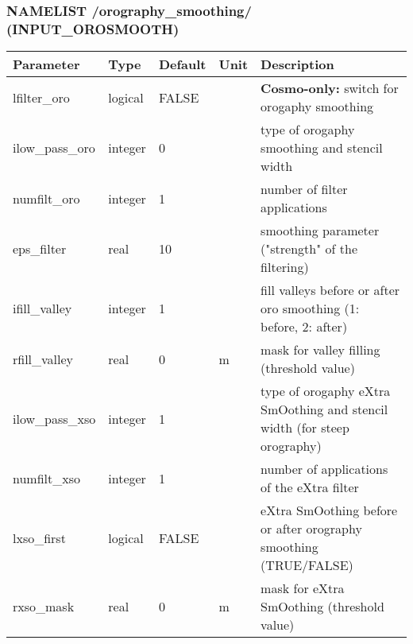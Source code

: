 \documentclass[a4paper,10pt,DIV14,BCOR1cm,titlepage,twoside]{scrartcl}
\providecommand{\tabularnewline}{\\}
\begin{document}
\subsubsection*{NAMELIST /orography\_smoothing/ (INPUT\_OROSMOOTH)}
\begin{longtable}{|p{4cm}|p{1.5cm}|p{1.5cm}|p{1cm}|p{6cm}|}
\hline 
\textbf{Parameter}& \textbf{Type}& \textbf{Default}& \textbf{Unit}& \textbf{Description}
\tabularnewline
\hline
\endhead
\hline
lfilter\_oro & logical & FALSE &  & \textbf{Cosmo-only: } switch for orogaphy smoothing
\tabularnewline
\hline 
ilow\_pass\_oro & integer & 0 &  & type of orogaphy smoothing and stencil width
\tabularnewline
\hline 
numfilt\_oro & integer & 1 &  & number of filter applications 
\tabularnewline
\hline 
eps\_filter & real & 10 &  & smoothing parameter ("strength" of the filtering)
\tabularnewline
\hline 
ifill\_valley & integer & 1 &  & fill valleys before or after oro smoothing (1: before, 2: after)
\tabularnewline
\hline 
rfill\_valley & real & 0 & m &  mask for valley filling (threshold value)
\tabularnewline
\hline 
ilow\_pass\_xso & integer & 1 &  & type of orogaphy eXtra SmOothing and stencil width (for steep orography)
\tabularnewline
\hline 
numfilt\_xso & integer & 1 &  & number of applications of the eXtra filter
\tabularnewline
\hline 
lxso\_first & logical & FALSE &  & eXtra SmOothing before or after orography smoothing (TRUE/FALSE)
\tabularnewline
\hline
rxso\_mask & real & 0 & m &  mask for eXtra SmOothing (threshold value)
\tabularnewline
\hline
\bottomrule
\end{longtable}
\end{document}
